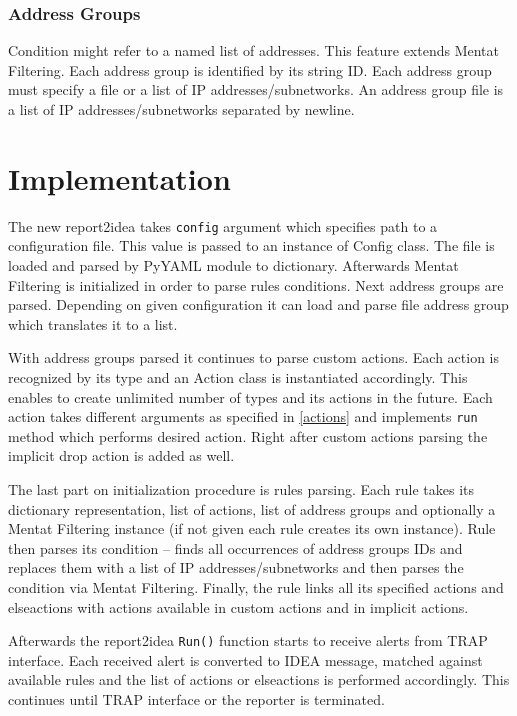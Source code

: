 \documentclass[11pt,a4paper]{article}
\begin{document}
\subsubsection{Address Groups}

Condition might refer to a named list of addresses. This feature extends Mentat Filtering. Each address group is identified by its string ID. Each address group must specify a file or a list of IP addresses/subnetworks. An address group file is a list of IP addresses/subnetworks separated by newline.

\section{Implementation}

The new report2idea takes \texttt{config} argument which specifies path to a configuration file. This value is passed to an instance of Config class. The file is loaded and parsed by PyYAML module to dictionary. Afterwards Mentat Filtering is initialized in order to parse rules conditions. Next address groups are parsed. Depending on given configuration it can load and parse file address group which translates it to a list.

With address groups parsed it continues to parse custom actions. Each action is recognized by its type and an Action class is instantiated accordingly. This enables to create unlimited number of types and its actions in the future. Each action takes different arguments as specified in \ref{actions} and implements \texttt{run} method which performs desired action. Right after custom actions parsing the implicit drop action is added as well.

The last part on initialization procedure is rules parsing. Each rule takes its dictionary representation, list of actions, list of address groups and optionally a Mentat Filtering instance (if not given each rule creates its own instance). Rule then parses its condition -- finds all occurrences of address groups IDs and replaces them with a list of IP addresses/subnetworks and then parses the condition via Mentat Filtering. Finally, the rule links all its specified actions and elseactions with actions available in custom actions and in implicit actions.

Afterwards the report2idea \texttt{Run()} function starts to receive alerts from TRAP interface. Each received alert is converted to IDEA message, matched against available rules and the list of actions or elseactions is performed accordingly. This continues until TRAP interface or the reporter is terminated.
\end{document}
